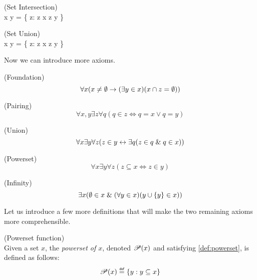 \begin{definition}{(Set Intersection)}\\
\beq
x \cap y = \{ z: z \in x \et z \in y \}
\eeq
\end{definition}

\begin{definition}{(Set Union)}\\
\beq
x \cup y = \{ z: z \in x \lor z \in y \}
\eeq
\end{definition}

Now we can introduce more axioms.
\begin{definition}{(Foundation)}\label{def:foundation}
\begin{equation}
\forall x (x \neq \emptyset \then (\exists y \in x) (x \cap z = \emptyset)) %
\end{equation}
\end{definition}

\begin{definition}{(Pairing)}\label{def:pairing}
\begin{equation}
\forall x, y \exists z \forall q (q \in z \iff q = x \lor q = y) %
\end{equation}
\end{definition}

\begin{definition}{(Union)}\label{def:union}
\begin{equation}
\forall x \exists y \forall z (z \in y \iff \exists q( z \in q \et q \in x)) %
\end{equation}
\end{definition}

\begin{definition}{(Powerset)}\label{def:powerset}
\begin{equation}
\forall x \exists y \forall z (z \subseteq x \iff z \in y) %
\end{equation}
\end{definition}

\begin{definition}{(Infinity)}\label{def:infinity}
\begin{equation}
\exists x (\emptyset \in x \mathrel{\&} (\forall y \in x)(y\cup\{y\} \in x))
\end{equation}
\end{definition}

Let us introduce a few more definitions that will make the two remaining axioms more comprehensible.
\begin{definition}{(Powerset function)}\\
Given a set $x$, the \emph{powerset of $x$}, denoted $\mathscr{P} (x)$ and satisfying \ref{def:powerset}, is defined as follows:
\begin{equation}
\power{x} \defeq \{y: y \subseteq x\}
\end{equation}
\end{definition}

